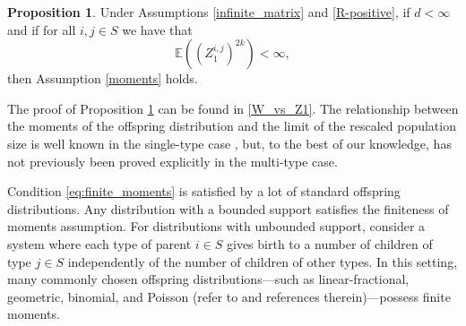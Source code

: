\documentclass[preprint,3p,12pt]{elsarticle}
\theoremstyle{definition}
\newtheorem{proposition}{Proposition}
\begin{document}
\begin{proposition} \label{prop:W_vs_Z1}
Under Assumptions \ref{infinite_matrix} and \ref{R-positive}, if $d < \infty$ and if for all $i,j \in S$ we have that
\begin{equation}
    \mathbb{E}\left(\left(Z_1^{i,j}\right)^{2k}\right) < \infty \label{eq:finite_moments},
\end{equation}
    then Assumption \ref{moments} holds. %
\end{proposition}

The proof of Proposition \ref{prop:W_vs_Z1} can be found in \ref{W_vs_Z1}. The relationship between the moments of the offspring distribution and the limit of the rescaled population size is well known in the single-type case \cite{bingham}, but, to the best of our knowledge, has not previously been proved explicitly in the multi-type case.

Condition \ref{eq:finite_moments} is satisfied by a lot of standard offspring distributions. Any distribution with a bounded support satisfies the finiteness of moments assumption. For distributions with unbounded support, consider a system where each type of parent $i \in S$ gives birth to a number of children of type $j \in S$ independently of the number of children of other types. In this setting, many commonly chosen offspring distributions---such as linear-fractional, geometric, binomial, and Poisson (refer to \cite{branching_biology} and references therein)---possess finite moments.
\end{document}
